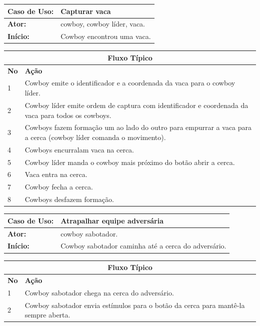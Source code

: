 \documentclass{llncs}
\begin{document}
\begin{center}
\begin{tabular}{|p{2.5cm}|p{10cm}|}
\hline
\rowcolor[gray]{0.8} \textbf{Caso de Uso:}	&\textbf{Capturar vaca} \\
\hline
\textbf{Ator:} 			&cowboy, cowboy líder, vaca. \\
\hline
\textbf{Início:}		&Cowboy encontrou uma vaca. \\
\hline
\end{tabular}
\begin{tabular}{|p{0.5cm}|p{12cm}|}
\hline
\multicolumn{2}{|c|}{\textbf{Fluxo Típico}} \\
\hline
\textbf{No}	&\textbf{Ação} \\
\hline
1	&Cowboy emite o identificador e a coordenada da vaca para o cowboy líder. \\
\hline
2	&Cowboy líder emite ordem de captura com identificador e coordenada da vaca para todos os cowboys. \\
\hline
3	&Cowboys fazem formação um ao lado do outro para empurrar a vaca para a cerca (cowboy líder comanda o movimento). \\
\hline
4	&Cowboys encurralam vaca na cerca. \\
\hline
5	&Cowboy líder manda o cowboy mais próximo do botão abrir a cerca. \\
\hline
6	&Vaca entra na cerca. \\
\hline
7	&Cowboy fecha a cerca. \\
\hline
8	&Cowboys desfazem formação. \\
\hline
\end{tabular}
\end{center}

\begin{center}
\begin{tabular}{|p{2.5cm}|p{10cm}|}
\hline
\rowcolor[gray]{0.8} \textbf{Caso de Uso:}	&\textbf{Atrapalhar equipe adversária} \\
\hline
\textbf{Ator:} 			&cowboy sabotador. \\
\hline
\textbf{Início:}		&Cowboy sabotador caminha até a cerca do adversário. \\
\hline
\end{tabular}
\begin{tabular}{|p{0.5cm}|p{12cm}|}
\hline
\multicolumn{2}{|c|}{\textbf{Fluxo Típico}} \\
\hline
\textbf{No}	&\textbf{Ação} \\
\hline
1	&Cowboy sabotador chega na cerca do adversário. \\
\hline
2	&Cowboy sabotador envia estímulos para o botão da cerca para mantê-la sempre aberta. \\
\hline
\end{tabular}
\end{center}
\end{document}
